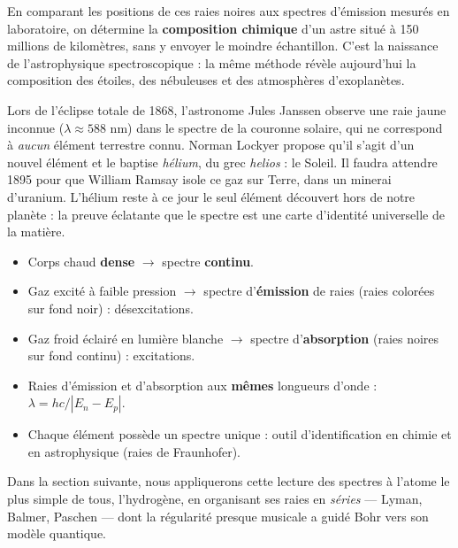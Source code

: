 \documentclass[11pt]{article}
\begin{document}
En comparant les positions de ces raies noires aux spectres d'émission mesurés en laboratoire, on détermine la \textbf{composition chimique} d'un astre situé à 150 millions de kilomètres, sans y envoyer le moindre échantillon. C'est la naissance de l'astrophysique spectroscopique : la même méthode révèle aujourd'hui la composition des étoiles, des nébuleuses et des atmosphères d'exoplanètes.

\begin{savaistu}
Lors de l'éclipse totale de 1868, l'astronome Jules Janssen observe une raie jaune inconnue ($\lambda \approx 588$ nm) dans le spectre de la couronne solaire, qui ne correspond à \emph{aucun} élément terrestre connu. Norman Lockyer propose qu'il s'agit d'un nouvel élément et le baptise \emph{hélium}, du grec \emph{helios} : le Soleil. Il faudra attendre 1895 pour que William Ramsay isole ce gaz sur Terre, dans un minerai d'uranium. L'hélium reste à ce jour le seul élément découvert hors de notre planète : la preuve éclatante que le spectre est une carte d'identité universelle de la matière.
\end{savaistu}

\begin{aretenir}
\begin{itemize}
\item Corps chaud \textbf{dense} $\rightarrow$ spectre \textbf{continu}.
\item Gaz excité à faible pression $\rightarrow$ spectre d'\textbf{émission} de raies (raies colorées sur fond noir) : désexcitations.
\item Gaz froid éclairé en lumière blanche $\rightarrow$ spectre d'\textbf{absorption} (raies noires sur fond continu) : excitations.
\item Raies d'émission et d'absorption aux \textbf{mêmes} longueurs d'onde : $\lambda = hc/|E_n - E_p|$.
\item Chaque élément possède un spectre unique : outil d'identification en chimie et en astrophysique (raies de Fraunhofer).
\end{itemize}
\end{aretenir}

Dans la section suivante, nous appliquerons cette lecture des spectres à l'atome le plus simple de tous, l'hydrogène, en organisant ses raies en \emph{séries} — Lyman, Balmer, Paschen — dont la régularité presque musicale a guidé Bohr vers son modèle quantique.
\end{document}
